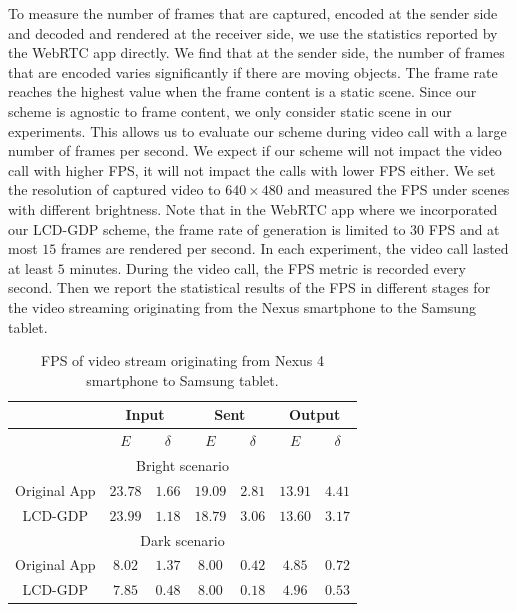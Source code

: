To measure the number of frames that are captured, encoded at the
sender side and decoded and rendered at the receiver side, we use the
statistics reported by the WebRTC app directly.  We find that at the
sender side, the number of frames that are encoded varies
significantly if there are moving objects.  The frame rate reaches the
highest value when the frame content is a static scene.  Since our
scheme is agnostic to frame content, we only consider static scene in
our experiments.  This allows us to evaluate our scheme during video
call with a large number of frames per second.  We expect if our scheme
will not impact the video call with higher FPS, it will not impact the
calls with lower FPS either.  We set the resolution of captured video
to $640\times 480$ and measured the FPS under scenes with different
brightness.  Note that in the WebRTC app where we incorporated our
LCD-GDP scheme, the frame rate of generation is limited to $30$ FPS
and at most $15$ frames are rendered per second. In each experiment,
the video call lasted at least $5$ minutes. 
During the video call, the FPS metric is recorded every second. 
Then we report the statistical results of the FPS in different stages for the
video streaming originating from the Nexus smartphone to the Samsung tablet.



\begin{table}[t]
  \footnotesize
  \centering
  \caption{FPS of video stream originating from Nexus 4 smartphone to
    Samsung tablet.}
  \label{tab:fps}
  \begin{tabular}{|c||c|c||c|c||c|c|} %
    \hline
    & \multicolumn{2}{|c||}{Input} & \multicolumn{2}{|c||}{Sent}
    & \multicolumn{2}{|c|}{Output}
    \\ \hline
    & $E$ & $\delta$ & $E$ & $\delta$ & $E$ & $\delta$ \\ \hline
    \multicolumn{7}{|c|}{Bright scenario} \\ \hline
    Original App & $23.78$ & $1.66$ & $19.09$ & $2.81$ & $13.91$ & $4.41$ 
    \\ \hline
    LCD-GDP & $23.99$ & $1.18$ & $18.79$ & $3.06$ & $13.60$ & $3.17$
    \\ \hline
    \multicolumn{7}{|c|}{Dark scenario} \\ \hline
    Original App & $8.02$ & $1.37$ & $8.00$ & $0.42$ & $4.85$ & $0.72$ \\ \hline
    LCD-GDP & $7.85$ & $0.48$ & $8.00$ & $0.18$ & $4.96$ & $0.53$ \\ \hline
  \end{tabular}
  \vspace{-18pt}  
\end{table}


